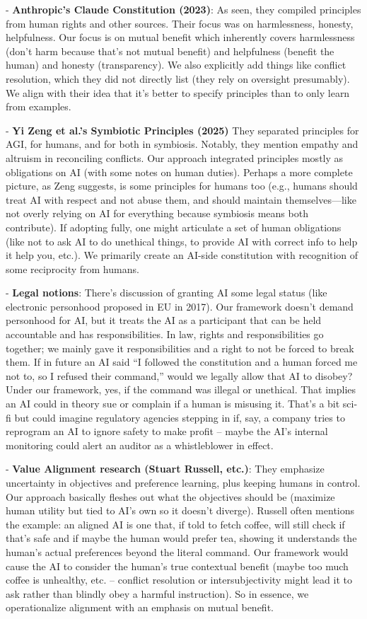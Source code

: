 \documentclass[12pt]{article}
\begin{document}
- \textbf{Anthropic’s Claude Constitution (2023)}: As seen, they compiled principles from human rights and other sources. Their focus was on harmlessness, honesty, helpfulness. Our focus is on mutual benefit which inherently covers harmlessness (don’t harm because that’s not mutual benefit) and helpfulness (benefit the human) and honesty (transparency). We also explicitly add things like conflict resolution, which they did not directly list (they rely on oversight presumably). We align with their idea that it’s better to specify principles than to only learn from examples.

- \textbf{Yi Zeng et al.’s Symbiotic Principles (2025)} They separated principles for AGI, for humans, and for both in symbiosis. Notably, they mention empathy and altruism in reconciling conflicts. Our approach integrated principles mostly as obligations on AI (with some notes on human duties). Perhaps a more complete picture, as Zeng suggests, is some principles for humans too (e.g., humans should treat AI with respect and not abuse them, and should maintain themselves—like not overly relying on AI for everything because symbiosis means both contribute). If adopting fully, one might articulate a set of human obligations (like not to ask AI to do unethical things, to provide AI with correct info to help it help you, etc.). We primarily create an AI-side constitution with recognition of some reciprocity from humans.

- \textbf{Legal notions}: There’s discussion of granting AI some legal status (like electronic personhood proposed in EU in 2017). Our framework doesn’t demand personhood for AI, but it treats the AI as a participant that can be held accountable and has responsibilities. In law, rights and responsibilities go together; we mainly gave it responsibilities and a right to not be forced to break them. If in future an AI said “I followed the constitution and a human forced me not to, so I refused their command,” would we legally allow that AI to disobey? Under our framework, yes, if the command was illegal or unethical. That implies an AI could in theory sue or complain if a human is misusing it. That’s a bit sci-fi but could imagine regulatory agencies stepping in if, say, a company tries to reprogram an AI to ignore safety to make profit – maybe the AI’s internal monitoring could alert an auditor as a whistleblower in effect.

- \textbf{Value Alignment research (Stuart Russell, etc.)}: They emphasize uncertainty in objectives and preference learning, plus keeping humans in control. Our approach basically fleshes out what the objectives should be (maximize human utility but tied to AI’s own so it doesn’t diverge). Russell often mentions the example: an aligned AI is one that, if told to fetch coffee, will still check if that’s safe and if maybe the human would prefer tea, showing it understands the human’s actual preferences beyond the literal command. Our framework would cause the AI to consider the human’s true contextual benefit (maybe too much coffee is unhealthy, etc. – conflict resolution or intersubjectivity might lead it to ask rather than blindly obey a harmful instruction). So in essence, we operationalize alignment with an emphasis on mutual benefit.
\end{document}
